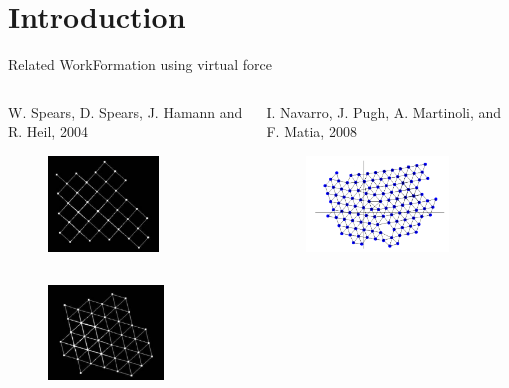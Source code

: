 \documentclass[10pt]{beamer}
\begin{document}
\section{Introduction}
\begin{frame}{Related Work}{Formation using virtual force}
   \begin{columns}[T] 
    \begin{column}{.45\textwidth}
      \scriptsize{W. Spears, D. Spears, J. Hamann and R. Heil, 2004}
      \begin{figure}
        \centering
        \includegraphics[height=1in]{figs/spears1.png}
      \end{figure}
    \end{column}%
    \begin{column}{.45\textwidth}
      \scriptsize{I. Navarro, J. Pugh, A. Martinoli, and
        F. Matia, 2008}
      \begin{figure}
        \centering
        \includegraphics[height=1in]{figs/navarro.png}
      \end{figure}      
    \end{column}
  \end{columns}
  \vspace{3mm}
  \begin{columns}[T] 
    \begin{column}{.45\textwidth}
      \begin{figure}
        \centering
        \includegraphics[height=1in]{figs/spears2.png}     

\end{figure}
\end{column}
\end{columns}
\end{frame}
\end{document}
